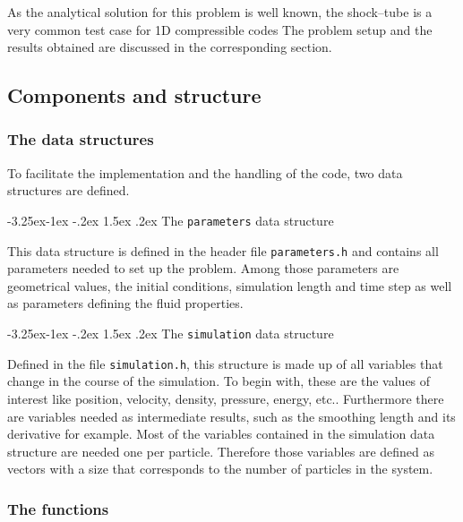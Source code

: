 \documentclass{report}
\makeatletter
\renewcommand\paragraph{\@startsection{paragraph}{4}{\z@}%
  {-3.25ex\@plus -1ex \@minus -.2ex}%
  {1.5ex \@plus .2ex}%
  {\normalfont\normalsize\bfseries}}
\makeatother
\begin{document}
As the analytical solution for this problem is well known, the shock--tube is a very 
common test case for 1D compressible codes \cite{Sod1978} 
The problem setup and the results obtained are discussed in the corresponding section.

\subsection{Components and structure}
\label{sec:CompAndStruc1DCode}

\subsubsection{The data structures}

To facilitate the implementation and the handling of the code, two data structures are defined. 

\paragraph{The {\tt parameters} data structure}

This data structure is defined in the header file {\tt parameters.h} and 
contains all parameters needed to set up the problem. Among those parameters are 
geometrical values, the initial conditions, simulation length and time step 
as well as parameters defining the fluid properties.

\paragraph{The {\tt simulation} data structure}

Defined in the file {\tt simulation.h}, this structure is made up of all 
variables that change in the course of the simulation. To begin with, these are the 
values of interest like position, velocity, density, pressure, energy, etc.. 
Furthermore there are variables needed as intermediate results, such as the smoothing 
length and its derivative for example. 
Most of the variables contained in the simulation data structure are needed one per 
particle. Therefore those variables are defined as vectors with a size that corresponds 
to the number of particles in the system. 

\subsubsection{The functions}
\end{document}
